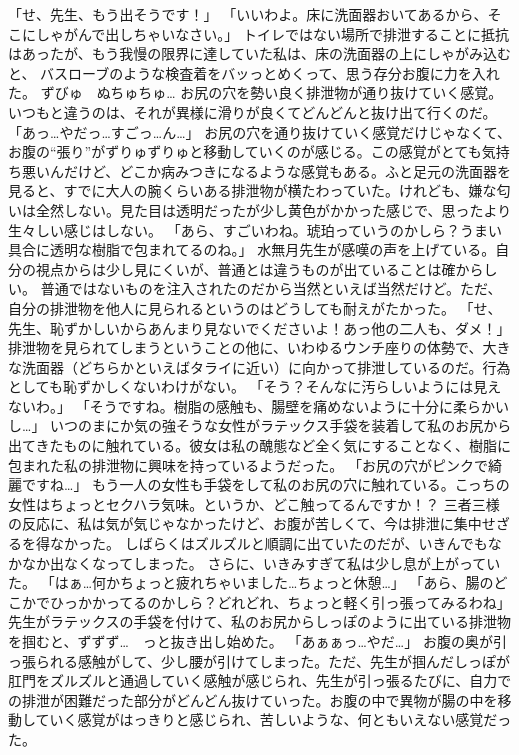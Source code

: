 「せ、先生、もう出そうです！」
「いいわよ。床に洗面器おいてあるから、そこにしゃがんで出しちゃいなさい。」
トイレではない場所で排泄することに抵抗はあったが、もう我慢の限界に達していた私は、床の洗面器の上にしゃがみ込むと、
バスローブのような検査着をバッっとめくって、思う存分お腹に力を入れた。
ずびゅ　ぬちゅちゅ…
お尻の穴を勢い良く排泄物が通り抜けていく感覚。いつもと違うのは、それが異様に滑りが良くてどんどんと抜け出て行くのだ。
「あっ…やだっ…すごっ…ん…」
お尻の穴を通り抜けていく感覚だけじゃなくて、お腹の“張り”がずりゅずりゅと移動していくのが感じる。この感覚がとても気持ち悪いんだけど、どこか病みつきになるような感覚もある。ふと足元の洗面器を見ると、すでに大人の腕くらいある排泄物が横たわっていた。けれども、嫌な匂いは全然しない。見た目は透明だったが少し黄色がかかった感じで、思ったより生々しい感じはしない。
「あら、すごいわね。琥珀っていうのかしら？うまい具合に透明な樹脂で包まれてるのね。」
水無月先生が感嘆の声を上げている。自分の視点からは少し見にくいが、普通とは違うものが出ていることは確からしい。
普通ではないものを注入されたのだから当然といえば当然だけど。ただ、自分の排泄物を他人に見られるというのはどうしても耐えがたかった。
「せ、先生、恥ずかしいからあんまり見ないでくださいよ！あっ他の二人も、ダメ！」
排泄物を見られてしまうということの他に、いわゆるウンチ座りの体勢で、大きな洗面器（どちらかといえばタライに近い）に向かって排泄しているのだ。行為としても恥ずかしくないわけがない。
「そう？そんなに汚らしいようには見えないわ。」
「そうですね。樹脂の感触も、腸壁を痛めないように十分に柔らかいし…」
いつのまにか気の強そうな女性がラテックス手袋を装着して私のお尻から出てきたものに触れている。彼女は私の醜態など全く気にすることなく、樹脂に包まれた私の排泄物に興味を持っているようだった。
「お尻の穴がピンクで綺麗ですね…」
もう一人の女性も手袋をして私のお尻の穴に触れている。こっちの女性はちょっとセクハラ気味。というか、どこ触ってるんですか！？
三者三様の反応に、私は気が気じゃなかったけど、お腹が苦しくて、今は排泄に集中せざるを得なかった。
しばらくはズルズルと順調に出ていたのだが、いきんでもなかなか出なくなってしまった。
さらに、いきみすぎて私は少し息が上がっていた。
「はぁ…何かちょっと疲れちゃいました…ちょっと休憩…」
「あら、腸のどこかでひっかかってるのかしら？どれどれ、ちょっと軽く引っ張ってみるわね」
先生がラテックスの手袋を付けて、私のお尻からしっぽのように出ている排泄物を掴むと、ずずず…　っと抜き出し始めた。
「あぁぁっ…やだ…」
お腹の奥が引っ張られる感触がして、少し腰が引けてしまった。ただ、先生が掴んだしっぽが肛門をズルズルと通過していく感触が感じられ、先生が引っ張るたびに、自力での排泄が困難だった部分がどんどん抜けていった。お腹の中で異物が腸の中を移動していく感覚がはっきりと感じられ、苦しいような、何ともいえない感覚だった。
